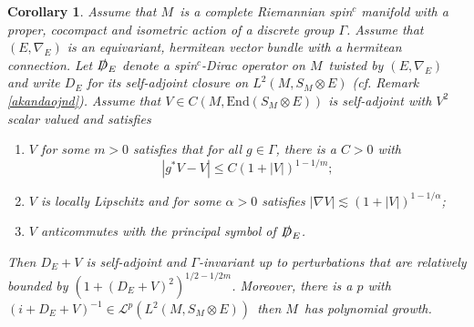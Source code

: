 \documentclass[a4paper,reqno]{amsart}
\numberwithin{equation}{section}
\newtheorem{cor}[thm]{Corollary}
\theoremstyle{definition}
\theoremstyle{remark}
\begin{document}
\begin{cor}
\label{lakdjnadln}
Assume that $M$ is a complete Riemannian spin$^c$ manifold with a proper, cocompact and isometric action of a discrete group $\Gamma$. Assume that $(E,\nabla_E)$ is an equivariant, hermitean vector bundle with a hermitean connection. Let $\slashed{D}_E$ denote a spin$^c$-Dirac operator on $M$ twisted by $(E,\nabla_E)$ and write $D_E$ for its self-adjoint closure on $L^2(M,S_M\otimes E)$ (cf. Remark \ref{akandaojnd}). Assume that $V\in C(M,\mathrm{End}(S_M\otimes E))$ is self-adjoint with $V^2$ scalar valued and satisfies
\begin{enumerate}
\item $V$ for some $m>0$ satisfies that for all $g\in \Gamma$, there is a $C>0$ with 
$$|g^*V-V|\leq C(1+|V|)^{1-1/m};$$
\item $V$ is locally Lipschitz and for some $\alpha>0$ satisfies $|\nabla V|\lesssim (1+|V|)^{1-1/\alpha}$;
\item $V$ anticommutes with the principal symbol of $\slashed{D}_E$.
\end{enumerate}
Then $D_E+V$ is self-adjoint and $\Gamma$-invariant up to perturbations that are relatively bounded by $(1+(D_E+V)^2)^{1/2-1/2m}$. Moreover, there is a $p$ with $(i+D_E+V)^{-1}\in \mathcal{L}^p(L^2(M,S_M\otimes E))$ then $M$ has polynomial growth.
\end{cor}
\end{document}

